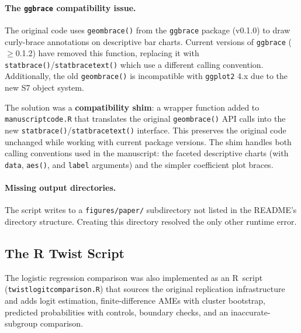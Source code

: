\documentclass[12pt, a4paper]{article}
\renewcommand\_{\textunderscore\hspace{0pt}}
\begin{document}
\paragraph{The \texttt{ggbrace} compatibility issue.}
The original code uses \texttt{geom\_brace()} from the \texttt{ggbrace} package (v0.1.0) to draw curly-brace annotations on descriptive bar charts. Current versions of \texttt{ggbrace} ($\geq$0.1.2) have removed this function, replacing it with \texttt{stat\_brace()}/\texttt{stat\_bracetext()} which use a different calling convention. Additionally, the old \texttt{geom\_brace()} is incompatible with \texttt{ggplot2} 4.x due to the new S7 object system.

The solution was a \textbf{compatibility shim}: a wrapper function added to \texttt{manuscript\_code.R} that translates the original \texttt{geom\_brace()} API calls into the new \texttt{stat\_brace()}\slash\texttt{stat\_bracetext()} interface. This preserves the original code unchanged while working with current package versions. The shim handles both calling conventions used in the manuscript: the faceted descriptive charts (with \texttt{data}, \texttt{aes()}, and \texttt{label} arguments) and the simpler coefficient plot braces.

\paragraph{Missing output directories.}
The script writes to a \texttt{figures/paper/} subdirectory not listed in the README's directory structure. Creating this directory resolved the only other runtime error.

\subsection{The R Twist Script}
The logistic regression comparison was also implemented as an R~script (\texttt{twist\_logit\_comparison.R}) that sources the original replication infrastructure and adds logit estimation, finite-difference AMEs with cluster bootstrap, predicted probabilities with controls, boundary checks, and an inaccurate-subgroup comparison.
\end{document}
